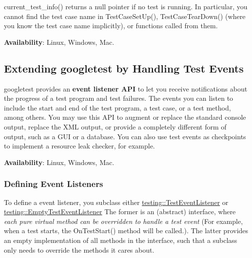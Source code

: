 \begin{DoxyCode}{0}
\DoxyCodeLine{}
\DoxyCodeLine{}
\DoxyCodeLine{}
\end{DoxyCode}


{\ttfamily current\+\_\+test\+\_\+info()} returns a null pointer if no test is running. In particular, you cannot find the test case name in {\ttfamily Test\+Case\+Set\+Up()}, {\ttfamily Test\+Case\+Tear\+Down()} (where you know the test case name implicitly), or functions called from them.

{\bfseries{Availability}}\+: Linux, Windows, Mac.

\subsection*{Extending googletest by Handling Test Events}

googletest provides an {\bfseries{event listener A\+PI}} to let you receive notifications about the progress of a test program and test failures. The events you can listen to include the start and end of the test program, a test case, or a test method, among others. You may use this A\+PI to augment or replace the standard console output, replace the X\+ML output, or provide a completely different form of output, such as a G\+UI or a database. You can also use test events as checkpoints to implement a resource leak checker, for example.

{\bfseries{Availability}}\+: Linux, Windows, Mac.

\subsubsection*{Defining Event Listeners}

To define a event listener, you subclass either \mbox{\hyperlink{classtesting_1_1TestEventListener}{testing\+::\+Test\+Event\+Listener}} or \mbox{\hyperlink{classtesting_1_1EmptyTestEventListener}{testing\+::\+Empty\+Test\+Event\+Listener}} The former is an (abstract) interface, where {\itshape each pure virtual method can be overridden to handle a test event} (For example, when a test starts, the {\ttfamily On\+Test\+Start()} method will be called.). The latter provides an empty implementation of all methods in the interface, such that a subclass only needs to override the methods it cares about.

